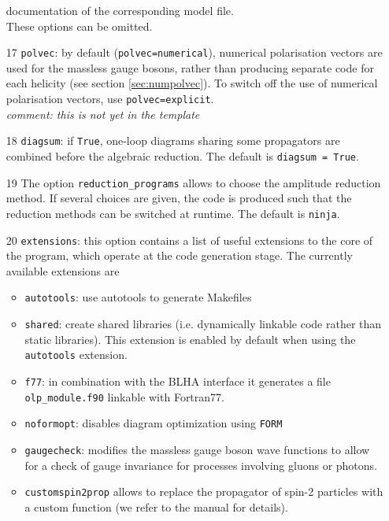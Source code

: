 \documentclass[11pt,a4paper]{refrep}
\newcommand{\form}{{\tt FORM}\xspace}
\begin{document}
\begin{enumerate}
documentation of the corresponding model file.
\\These options can be omitted.
\item[17] \texttt{polvec}: by default ({\tt polvec=numerical}), 
numerical polarisation vectors are used for the massless gauge bosons, 
rather than producing separate code for each helicity
(see section \ref{sec:numpolvec}). 
To switch off the use of numerical polarisation vectors, use {\tt polvec=explicit}.\\
{\it comment: this is not yet in the template}
\item[18] \texttt{diagsum}:  if {\tt True}, one-loop diagrams sharing some propagators
are combined before  the algebraic reduction.
The default is {\tt diagsum = True}. 
\item[19] The option \texttt{reduction\_programs} 
allows to choose the amplitude reduction method. If several choices are given, 
the code is produced such that the reduction methods can be switched at runtime.
The default is {\tt ninja}.
\item[20] {\tt extensions}: 
this option  contains a list of useful extensions
to the core of the program, which operate at the code generation stage. 
The currently available extensions are 
\begin{itemize}
\item {\tt autotools}:  use autotools to generate Makefiles            
\item {\tt shared}: create shared libraries (i.e. dynamically linkable code
rather than static libraries). This extension is 
enabled by default when using the {\tt autotools} extension.    
\item {\tt f77}: in combination with the BLHA interface it generates
                     a file {\tt olp\_module.f90} linkable with Fortran77.      
\item {\tt noformopt}:  disables diagram optimization using \form        
\item {\tt gaugecheck}:  modifies the massless gauge boson wave functions to allow for
a check of gauge invariance for processes involving 
gluons or photons. 
\item {\tt customspin2prop} allows to replace the propagator of spin-2 particles  
with a custom function (we refer to the manual for details).
\end{itemize}

\end{enumerate}
\end{document}
